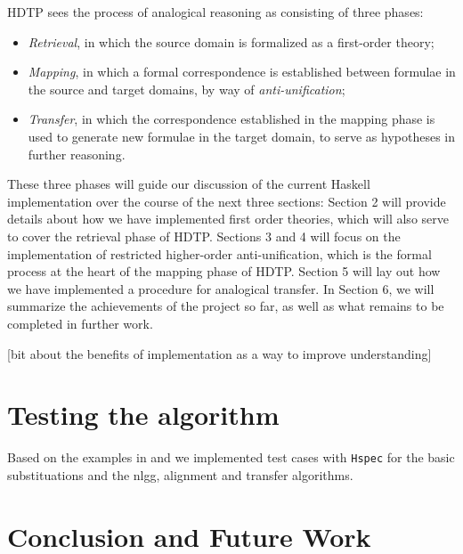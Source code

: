 \documentclass[12pt,a4paper]{article}
\begin{document}
HDTP sees the process of analogical reasoning as consisting of three phases: 
\begin{itemize}
    \item \textit{Retrieval}, in which the source domain is formalized as a first-order theory;
    \item \textit{Mapping}, in which a formal correspondence is established between formulae in the source and target domains, by way of \textit{anti-unification};
    \item \textit{Transfer}, in which the correspondence established in the mapping phase is used to generate new formulae in the target domain, to serve as hypotheses in further reasoning.
\end{itemize} 

These three phases will guide our discussion of the current Haskell implementation over the course of the next three sections: Section 2 will provide details about how we have implemented first order theories, which will also serve to cover the retrieval phase of HDTP. Sections 3 and 4 will focus on the implementation of restricted higher-order anti-unification, which is the formal process at the heart of the mapping phase of HDTP. Section 5 will lay out how we have implemented a procedure for analogical transfer. In Section 6, we will summarize the achievements of the project so far, as well as what remains to be completed in further work.
% 

[bit about the benefits of implementation as a way to improve understanding]



\section{Testing the algorithm}

Based on the examples in \cite{Schmidt-2014} and \cite{Tabareau2013AntiUnificationWT} we implemented test cases with \texttt{Hspec} for the basic substituations and the nlgg, alignment and transfer algorithms.



\section{Conclusion and Future Work}
% 





\end{document}
